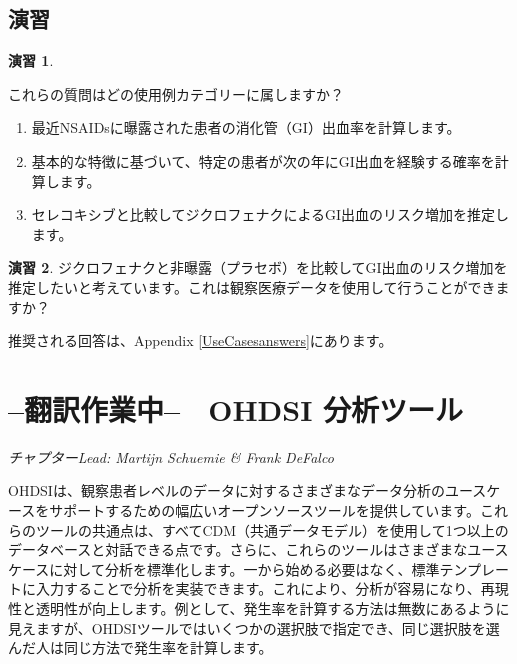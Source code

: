 \documentclass[
  11pt]{book}
\theoremstyle{definition}
\theoremstyle{definition}
\theoremstyle{definition}
\newtheorem{exercise}{演習}[chapter]
\theoremstyle{definition}
\theoremstyle{remark}
\begin{document}
\section{演習}\label{ux6f14ux7fd2-2}

\begin{exercise}
\protect\hypertarget{exr:exerciseUseCases1}{}\label{exr:exerciseUseCases1}

これらの質問はどの使用例カテゴリーに属しますか？

\begin{enumerate}
\def\labelenumi{\arabic{enumi}.}
\item
  最近NSAIDsに曝露された患者の消化管（GI）出血率を計算します。
\item
  基本的な特徴に基づいて、特定の患者が次の年にGI出血を経験する確率を計算します。
\item
  セレコキシブと比較してジクロフェナクによるGI出血のリスク増加を推定します。
\end{enumerate}

\end{exercise}

\begin{exercise}
\protect\hypertarget{exr:exerciseUseCases2}{}\label{exr:exerciseUseCases2}ジクロフェナクと非曝露（プラセボ）を比較してGI出血のリスク増加を推定したいと考えています。これは観察医療データを使用して行うことができますか？
\end{exercise}

推奨される回答は、Appendix \ref{UseCasesanswers}にあります。

\chapter{--翻訳作業中--　OHDSI 分析ツール}\label{OhdsiAnalyticsTools}

\emph{チャプターLead: Martijn Schuemie \& Frank DeFalco}

OHDSIは、観察患者レベルのデータに対するさまざまなデータ分析のユースケースをサポートするための幅広いオープンソースツールを提供しています。これらのツールの共通点は、すべてCDM（共通データモデル）を使用して1つ以上のデータベースと対話できる点です。さらに、これらのツールはさまざまなユースケースに対して分析を標準化します。一から始める必要はなく、標準テンプレートに入力することで分析を実装できます。これにより、分析が容易になり、再現性と透明性が向上します。例として、発生率を計算する方法は無数にあるように見えますが、OHDSIツールではいくつかの選択肢で指定でき、同じ選択肢を選んだ人は同じ方法で発生率を計算します。
\end{document}
